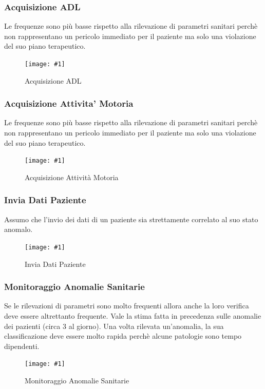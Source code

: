 \documentclass[a4paper,11pt,oneside, table]{article}
\newcommand{\putimage}[4] {
	\begin{figure}[H]
	    \centering
	    \texttt{[image: \#1]}
	    \caption{#2}\label{#3}
	\end{figure}
}
\begin{document}
\subsubsection{Acquisizione ADL}

Le frequenze sono pi\`u basse rispetto alla rilevazione di parametri sanitari perch\`e non rappresentano un pericolo immediato per il paziente ma solo una violazione del suo piano terapeutico.

\putimage{images/Diagramma delle Attivita'/Acquisizione ADL.png}{Acquisizione ADL}{png:act:acquisizione-adl}{1}

\subsubsection{Acquisizione Attivita' Motoria}

Le frequenze sono pi\`u basse rispetto alla rilevazione di parametri sanitari perch\`e non rappresentano un pericolo immediato per il paziente ma solo una violazione del suo piano terapeutico.

\putimage{images/Diagramma delle Attivita'/Acquisizione Attivita' Motoria.png}{Acquisizione Attivit\`a Motoria}{png:act:acquisizione-attivita-motoria}{1}

\subsubsection{Invia Dati Paziente}

Assumo che l'invio dei dati di un paziente sia strettamente correlato al suo stato anomalo.

\putimage{images/Diagramma delle Attivita'/Invia Dati Paziente.png}{Invia Dati Paziente}{png:act:invia-dati-paziente}{1}

\subsubsection{Monitoraggio Anomalie Sanitarie}

Se le rilevazioni di parametri sono molto frequenti allora anche la loro verifica deve essere altrettanto frequente.
Vale la stima fatta in precedenza sulle anomalie dei pazienti (circa 3 al giorno).
Una volta rilevata un'anomalia, la sua classificazione deve essere molto rapida perch\`e alcune patologie sono tempo dipendenti.

\putimage{images/Diagramma delle Attivita'/Monitoraggio Anomalie Sanitarie.png}{Monitoraggio Anomalie Sanitarie}{png:act:monitoraggio-anomalie-sanitarie}{1}
\end{document}
